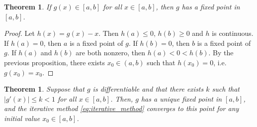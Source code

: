 \documentclass{article}
\theoremstyle{plain}
\newtheorem{theorem}[proposition]{Theorem}
\begin{document}
\begin{theorem}
  If $g(x) \in [a,b]$ for all $x \in [a,b]$, then $g$ has a fixed point in $[a,b]$.
\end{theorem}
\begin{proof}
  Let $h(x) = g(x) - x$.
  Then $h(a) \leq 0$, $h(b) \geq 0$ and $h$ is continuous.
  If $h(a) = 0$, then $a$ is a fixed point of $g$.
  If $h(b) = 0$, then $b$ is a fixed point of $g$.
  If $h(a)$ and $h(b)$ are both nonzero, then $h(a) < 0 < h(b)$.
  By the previous proposition, there exists $x_0 \in (a,b)$ such that $h(x_0) = 0$, i.e. $g(x_0) = x_0$.
\end{proof}

\begin{theorem}
  Suppose that $g$ is differentiable and that there exists $k$ such that $|g'(x)| \leq k < 1$ for all $x \in [a,b]$.
  Then, $g$ has a unique fixed point in $[a,b]$, and the iterative method \eqref{eq:iterative_method} converges to this point for any initial value $x_0 \in [a,b]$.
\end{theorem}
\end{document}

